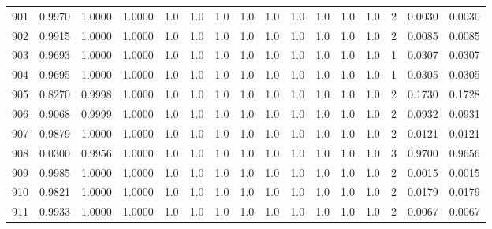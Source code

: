 \begin{tabular}{lrrrrrrrrrrrrrrr}
901 &      0.9970 &  1.0000 &  1.0000 &     1.0 &     1.0 &     1.0 &     1.0 &     1.0 &     1.0 &     1.0 &      1.0 &        1.0 &      2 &                    0.0030 &                     0.0030 \\
902 &      0.9915 &  1.0000 &  1.0000 &     1.0 &     1.0 &     1.0 &     1.0 &     1.0 &     1.0 &     1.0 &      1.0 &        1.0 &      2 &                    0.0085 &                     0.0085 \\
903 &      0.9693 &  1.0000 &  1.0000 &     1.0 &     1.0 &     1.0 &     1.0 &     1.0 &     1.0 &     1.0 &      1.0 &        1.0 &      1 &                    0.0307 &                     0.0307 \\
904 &      0.9695 &  1.0000 &  1.0000 &     1.0 &     1.0 &     1.0 &     1.0 &     1.0 &     1.0 &     1.0 &      1.0 &        1.0 &      1 &                    0.0305 &                     0.0305 \\
905 &      0.8270 &  0.9998 &  1.0000 &     1.0 &     1.0 &     1.0 &     1.0 &     1.0 &     1.0 &     1.0 &      1.0 &        1.0 &      2 &                    0.1730 &                     0.1728 \\
906 &      0.9068 &  0.9999 &  1.0000 &     1.0 &     1.0 &     1.0 &     1.0 &     1.0 &     1.0 &     1.0 &      1.0 &        1.0 &      2 &                    0.0932 &                     0.0931 \\
907 &      0.9879 &  1.0000 &  1.0000 &     1.0 &     1.0 &     1.0 &     1.0 &     1.0 &     1.0 &     1.0 &      1.0 &        1.0 &      2 &                    0.0121 &                     0.0121 \\
908 &      0.0300 &  0.9956 &  1.0000 &     1.0 &     1.0 &     1.0 &     1.0 &     1.0 &     1.0 &     1.0 &      1.0 &        1.0 &      3 &                    0.9700 &                     0.9656 \\
909 &      0.9985 &  1.0000 &  1.0000 &     1.0 &     1.0 &     1.0 &     1.0 &     1.0 &     1.0 &     1.0 &      1.0 &        1.0 &      2 &                    0.0015 &                     0.0015 \\
910 &      0.9821 &  1.0000 &  1.0000 &     1.0 &     1.0 &     1.0 &     1.0 &     1.0 &     1.0 &     1.0 &      1.0 &        1.0 &      2 &                    0.0179 &                     0.0179 \\
911 &      0.9933 &  1.0000 &  1.0000 &     1.0 &     1.0 &     1.0 &     1.0 &     1.0 &     1.0 &     1.0 &      1.0 &        1.0 &      2 &                    0.0067 &                     0.0067 \\

\end{tabular}

